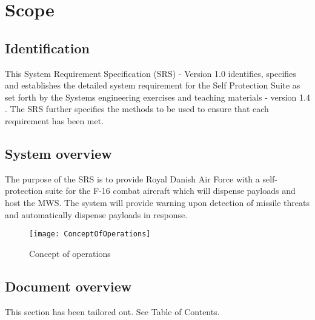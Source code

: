 \documentclass[Main]{subfiles}
\begin{document}
\chapter{Scope}

\section{Identification}
This System Requirement Specification (SRS) - Version 1.0 identifies, specifies and establishes the detailed system requirement for the Self Protection Suite as set forth by the Systems engineering exercises and teaching materials - version 1.4 \cite{SE-book}.
The SRS further specifies the methods to be used to ensure that each requirement has been met. 

\section{System overview}
The purpose of the SRS is to provide Royal Danish Air Force with a self-protection suite for the F-16 combat aircraft which will dispense payloads and host the MWS. 
The system will provide warning upon detection of missile threats and automatically dispense payloads in response.

\begin{figure}[H]
\centering
\texttt{[image: ConceptOfOperations]}
\caption{Concept of operations}
\end{figure}


\section{Document overview}
This section has been tailored out. See Table of Contents.
\end{document}
